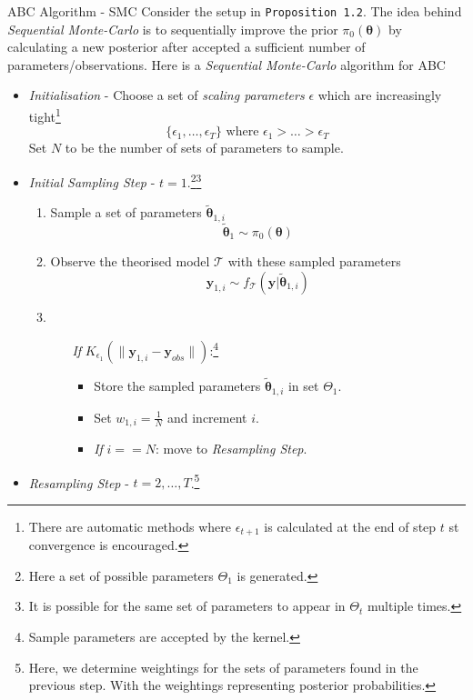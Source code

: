 \documentclass[11pt,a4paper]{article}
\begin{document}
  \begin{proposition}{ABC Algorithm - SMC\cite{Delayed_Acceptance_ABC_SMC}\cite{youtube_ABC_intro}\cite{doi:10.1098/rsif.2008.0172}}
    Consider the setup in \texttt{Proposition 1.2}. The idea behind \textit{Sequential Monte-Carlo} is to sequentially improve the prior $\pi_0(\pmb\theta)$ by calculating a new posterior after accepted a sufficient number of parameters/observations. Here is a \textit{Sequential Monte-Carlo} algorithm for ABC
    \begin{itemize}
      \item \textit{Initialisation} - Choose a set of \textit{scaling parameters} $\epsilon$ which are increasingly tight\footnote{There are automatic methods where $\epsilon_{t+1}$ is calculated at the end of step $t$ st convergence is encouraged.}
      \[ \{\epsilon_1,\dots,\epsilon_T\}\text{ where }\epsilon_1>\dots>\epsilon_T\]
      Set $N$ to be the number of sets of parameters to sample.
      \item \textit{Initial Sampling Step} - $t=1$.\footnote{Here a set of possible parameters $\Theta_1$ is generated.}\footnote{It is possible for the same set of parameters to appear in $\Theta_t$ multiple times.}
      \begin{enumerate}
        \item Sample a set of parameters $\tilde{\pmb\theta}_{1,i}$\[ \tilde{\pmb\theta}_1\sim\pi_0(\pmb\theta) \]
        \item Observe the theorised model $\mathcal{T}$ with these sampled parameters
        \[ \mathbf{y}_{1,i}\sim f_\mathcal{T}(\mathbf{y}|\tilde{\pmb\theta}_{1,i}) \]
        \item
        \begin{itemize}
          \item[\textit{If}] $K_{\epsilon_1}(\|\mathbf{y}_{1,i}-\mathbf{y}_{obs}\|)$:\footnote{Sample parameters are accepted by the kernel.}
          \begin{itemize}
            \item Store the sampled parameters $\tilde{\pmb\theta}_{1,i}$ in set $\Theta_1$.
            \item Set $w_{1,i}=\frac1N$ and increment $i$.
            \item \textit{If }$i==N$: move to \textit{Resampling Step}.
          \end{itemize}
        \end{itemize}
      \end{enumerate}
      \item \textit{Resampling Step} - $t=2,\dots,T$.\footnote{Here, we determine weightings for the sets of parameters found in the previous step. With the weightings representing posterior probabilities.}

\end{itemize}
\end{proposition}
\end{document}
